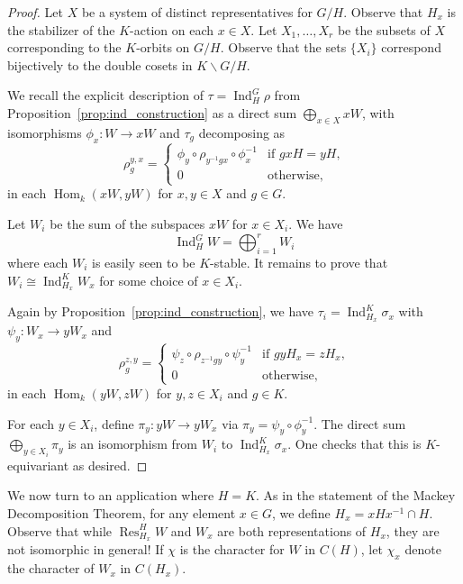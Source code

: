 \documentclass[12pt]{article}
\theoremstyle{plain}
\theoremstyle{definition}
\theoremstyle{remark}
\numberwithin{equation}{section}
\begin{document}
\begin{proof}
Let $X$ be a system of distinct representatives for $G/H$.
Observe that $H_x$ is the stabilizer of the $K$-action on each $x \in X$.
Let $X_1,\ldots,X_r$ be the subsets of $X$ corresponding to the
$K$-orbits on $G/H$.
Observe that the sets $\{X_i\}$ correspond bijectively to the
double cosets in $K \backslash G / H$.

We recall the explicit description of $\tau = \operatorname{Ind}^G_H \rho$
from Proposition~\ref{prop:ind_construction}
as a direct sum $\bigoplus_{x \in X} xW$,
with isomorphisms $\phi_x: W \to xW$ and $\tau_g$ decomposing as
\[
\rho_g^{y,x} =
\begin{cases}
\phi_y \circ \rho_{y^{-1}gx} \circ \phi_x^{-1} & \textrm{if $gxH=yH$,}\\
0 & \textrm{otherwise},
\end{cases}
\]
in each $\operatorname{Hom}_k(xW,yW)$
for $x,y \in X$ and $g \in G$.

Let $W_i$ be the sum of the subspaces $xW$ for $x \in X_i$.
We have
\[
\operatorname{Ind}^G_H W = \bigoplus_{i=1}^r W_i
\]
where each $W_i$ is easily seen to be $K$-stable.
It remains to prove that
$W_i \cong \operatorname{Ind}_{H_x}^K W_x$ for some choice of $x \in X_i$.

Again by Proposition~\ref{prop:ind_construction},
we have $\tau_i = \operatorname{Ind}_{H_x}^K \sigma_x$
with $\psi_y : W_x \to yW_x$ and
\[
\rho_g^{z,y} =
\begin{cases}
\psi_z \circ \rho_{z^{-1}gy} \circ \psi_y^{-1} & \textrm{if $gyH_x=zH_x$,}\\
0 & \textrm{otherwise},
\end{cases}
\]
in each $\operatorname{Hom}_k(yW,zW)$
for $y,z \in X_i$ and $g \in K$.

For each $y \in X_i$, define $\pi_y : yW \to yW_x$
via $\pi_y = \psi_y \circ \phi_y^{-1}$.
The direct sum $\bigoplus_{y \in X_i} \pi_y$
is an isomorphism from $W_i$ to $\operatorname{Ind}_{H_x}^K \sigma_x$.
One checks that this is $K$-equivariant as desired.
\end{proof}

We now turn to an application where $H=K$.
As in the statement of the Mackey Decomposition Theorem,
for any element $x \in G$, we define $H_x = xHx^{-1} \cap H$.
Observe that while $\operatorname{Res}^H_{H_x} W$
and $W_x$ are both representations of $H_x$,
they are not isomorphic in general!
If $\chi$ is the character for $W$ in $C(H)$, let $\chi_x$ denote the
character of $W_x$ in $C(H_x)$.
\end{document}
